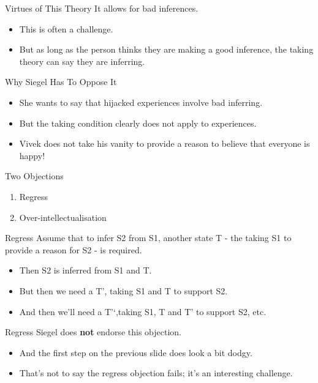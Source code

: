 \documentclass[
  17pt,
  letterpaper,
  ignorenonframetext,
  aspectratio=169,
  xcolor={dvipsnames}]{beamer}
\providecommand{\tightlist}{%
  \setlength{\itemsep}{0pt}\setlength{\parskip}{0pt}}\usepackage{longtable,booktabs,array}
\begin{document}
\begin{frame}{Virtues of This Theory}
\protect\hypertarget{virtues-of-this-theory-1}{}
It allows for bad inferences.

\begin{itemize}[<+->]
\tightlist
\item
  This is often a challenge.
\item
  But as long as the person thinks they are making a good inference, the
  taking theory can say they are inferring.
\end{itemize}
\end{frame}

\begin{frame}{Why Siegel Has To Oppose It}
\protect\hypertarget{why-siegel-has-to-oppose-it}{}
\begin{itemize}[<+->]
\tightlist
\item
  She wants to say that hijacked experiences involve bad inferring.
\item
  But the taking condition clearly does not apply to experiences.
\item
  Vivek does not take his vanity to provide a reason to believe that
  everyone is happy!
\end{itemize}
\end{frame}

\begin{frame}{Two Objections}
\protect\hypertarget{two-objections}{}
\begin{enumerate}[<+->]
\tightlist
\item
  Regress
\item
  Over-intellectualisation
\end{enumerate}
\end{frame}

\begin{frame}{Regress}
\protect\hypertarget{regress}{}
Assume that to infer S2 from S1, another state T - the taking S1 to
provide a reason for S2 - is required.

\begin{itemize}[<+->]
\tightlist
\item
  Then S2 is inferred from S1 and T.
\item
  But then we need a T', taking S1 and T to support S2.
\item
  And then we'll need a T'`,taking S1, T and T' to support S2, etc.
\end{itemize}
\end{frame}

\begin{frame}{Regress}
\protect\hypertarget{regress-1}{}
Siegel does \textbf{not} endorse this objection.

\begin{itemize}[<+->]
\tightlist
\item
  And the first step on the previous slide does look a bit dodgy.
\item
  That's not to say the regress objection fails; it's an interesting
  challenge.
\end{itemize}
\end{frame}
\end{document}
